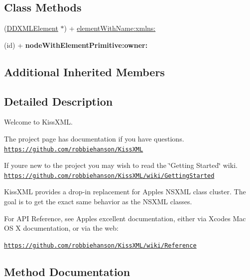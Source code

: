 \subsection*{Class Methods}
\begin{DoxyCompactItemize}
\item 
(\hyperlink{interface_d_d_x_m_l_element}{D\+D\+X\+M\+L\+Element} $\ast$) + \hyperlink{interface_d_d_x_m_l_element_a2b4f520a9a839e5233ea11bd04e7f6bf}{element\+With\+Name\+:xmlns\+:}
\item 
\hypertarget{interface_d_d_x_m_l_element_a892baf54010203b96c811ff0a50beedf}{}(id) + {\bfseries node\+With\+Element\+Primitive\+:owner\+:}\label{interface_d_d_x_m_l_element_a892baf54010203b96c811ff0a50beedf}

\end{DoxyCompactItemize}
\subsection*{Additional Inherited Members}


\subsection{Detailed Description}
Welcome to Kiss\+X\+M\+L.

The project page has documentation if you have questions. \href{https://github.com/robbiehanson/KissXML}{\tt https\+://github.\+com/robbiehanson/\+Kiss\+X\+M\+L}

If you\textquotesingle{}re new to the project you may wish to read the \char`\"{}\+Getting Started\char`\"{} wiki. \href{https://github.com/robbiehanson/KissXML/wiki/GettingStarted}{\tt https\+://github.\+com/robbiehanson/\+Kiss\+X\+M\+L/wiki/\+Getting\+Started}

Kiss\+X\+M\+L provides a drop-\/in replacement for Apple\textquotesingle{}s N\+S\+X\+M\+L class cluster. The goal is to get the exact same behavior as the N\+S\+X\+M\+L classes.

For A\+P\+I Reference, see Apple\textquotesingle{}s excellent documentation, either via Xcode\textquotesingle{}s Mac O\+S X documentation, or via the web\+:

\href{https://github.com/robbiehanson/KissXML/wiki/Reference}{\tt https\+://github.\+com/robbiehanson/\+Kiss\+X\+M\+L/wiki/\+Reference} 

\subsection{Method Documentation}
\hypertarget{interface_d_d_x_m_l_element_a4633a5b7adc0664bd8bc695ff07cf85f}{}
